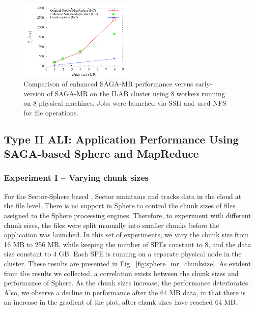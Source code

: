 \documentclass[3p,twocolumn]{elsarticle}
\begin{document}
\begin{figure}[htb!]
 \includegraphics[width=0.5\textwidth]{figures/sagamr_comparison.pdf}
 \caption{
   Comparison of enhanced SAGA-MR performance versus
   early-version of SAGA-MR on the ILAB cluster using 8 workers running on 8
   physical machines. Jobs were launched via SSH and used NFS for file
   operations.
   \label{fig:sagamr_comparison}
   }
\end{figure}


\subsection{Type II ALI: Application Performance Using SAGA-based
Sphere and MapReduce}

\subsubsection{Experiment I -- Varying chunk sizes} 

For the Sector-Sphere based \wc, Sector maintains and tracks data in
the cloud at the file level. There is no support in Sphere to control
the chunk sizes of files assigned to the Sphere processing
engines. Therefore, to experiment with different chunk sizes, the
files were split manually into smaller chunks before the \wc
application was launched. In this set of experiments, we vary the
chunk size from 16 MB to 256 MB, while keeping the number of SPEs
constant to 8, and the data size constant to 4 GB. Each SPE is running
on a separate physical node in the cluster. These results are
presented in Fig.~\ref{fig:sphere_mr_chunksize}.  As evident from the
results we collected, a correlation exists between the chunk sizes and
performance of Sphere.  As the chunk sizes increase, the performance
deteriorates. Also, we observe a decline in performance after the 64
MB data, in that there is an increase in the gradient of the plot,
after chunk sizes have reached 64 MB.

\end{document}
